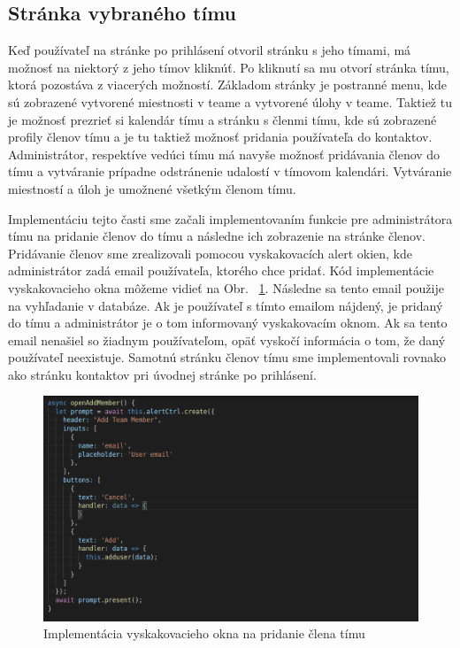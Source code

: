 \subsection{Stránka vybraného tímu}
\indent Keď používateľ na stránke po prihlásení otvoril stránku s jeho tímami, má možnosť na niektorý z jeho tímov kliknúť. Po kliknutí sa mu otvorí stránka tímu, ktorá pozostáva z viacerých možností. Základom stránky je postranné menu, kde sú zobrazené vytvorené miestnosti v teame a vytvorené úlohy v teame. Taktiež tu je možnosť prezrieť si kalendár tímu a stránku s členmi tímu, kde sú zobrazené profily členov tímu a je tu taktiež možnosť pridania používateľa do kontaktov. Administrátor, respektíve vedúci tímu má navyše možnosť pridávania členov do tímu a vytváranie prípadne odstránenie udalostí v tímovom kalendári. Vytváranie miestností a úloh je umožnené všetkým členom tímu. 

\indent Implementáciu tejto časti sme začali implementovaním funkcie pre administrátora tímu na pridanie členov do tímu a následne ich zobrazenie na stránke členov. Pridávanie členov sme zrealizovali pomocou vyskakovacích alert okien, kde administrátor zadá email používateľa, ktorého chce pridať. Kód implementácie vyskakovacieho okna môžeme vidieť na Obr.  ~\ref{fig:add_user_alert}. Následne sa tento email použije na vyhľadanie v databáze. Ak je používateľ s tímto emailom nájdený, je pridaný do tímu a administrátor je o tom  informovaný vyskakovacím oknom. Ak sa tento email nenašiel so žiadnym používateľom, opäť vyskočí informácia o tom, že daný používateľ neexistuje. Samotnú stránku členov tímu sme implementovali rovnako ako stránku kontaktov pri úvodnej stránke po prihlásení. 

\begin{figure}[H]
    \centering
    \includegraphics[scale=0.45]{img/imp/add_user_alert.png}
    \caption{Implementácia vyskakovacieho okna na pridanie člena tímu}
    \label{fig:add_user_alert}
\end{figure}

